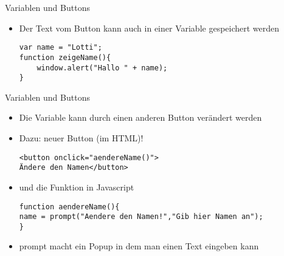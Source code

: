 \documentclass[18pt]{beamer}
\begin{document}
\begin{frame}[fragile]{Variablen und Buttons}
\begin {itemize}
\item Der Text vom Button kann auch in einer Variable gespeichert werden
\begin{lstlisting}
var name = "Lotti";
function zeigeName(){
	window.alert("Hallo " + name);
}
\end{lstlisting}
\end {itemize}
\end{frame}


\begin{frame}[fragile]{Variablen und Buttons}
\begin {itemize}
\item Die Variable kann durch einen anderen Button verändert werden
\item Dazu: neuer Button (im HTML)!
\begin{lstlisting}
<button onclick="aendereName()">
Ändere den Namen</button>
\end{lstlisting}
\item und die Funktion in Javascript 
\begin{lstlisting}
function aendereName(){
name = prompt("Aendere den Namen!","Gib hier Namen an");
}
\end{lstlisting}
\item prompt macht ein Popup in dem man einen Text eingeben kann
\end {itemize}
\end{frame}
\end{document}
